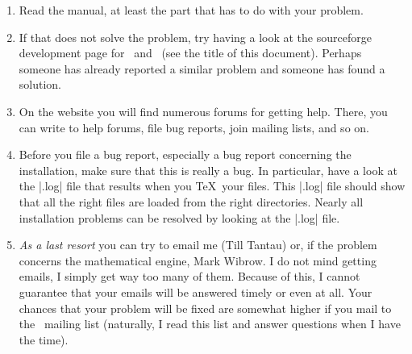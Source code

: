 \begin{enumerate}
\item
  Read the manual, at least the part that has to do with your problem.
\item
  If that does not solve the problem, try having a look at the
  sourceforge development page for \pgfname\ and \tikzname\ (see the
  title of this document). Perhaps someone has already reported a
  similar problem and someone has found a solution.
\item
  On the website you will find numerous forums for getting
  help. There, you can write to help forums, file bug reports, join
  mailing lists, and so on.
\item
  Before you file a bug report, especially a bug report concerning the
  installation, make sure that this is really a bug. In particular,
  have a look at the |.log| file that results when you \TeX\ your
  files. This |.log| file should show that all the right files are
  loaded from the right directories. Nearly all installation problems
  can be resolved by looking at the |.log| file.
\item
  \emph{As a last resort} you can try to email me (Till Tantau) or, if
  the problem concerns the mathematical engine, Mark Wibrow. I do
  not mind getting emails, I simply get way too many of them. Because
  of this, I cannot guarantee that your emails will be answered timely
  or even at all. Your chances that your problem will be fixed are
  somewhat higher if you mail to the \pgfname\ mailing list
  (naturally, I read this list and answer questions when I have the
  time).
\end{enumerate}
